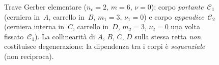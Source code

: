 \begin{figure}[!ht]
{
	}
	\caption{Trave Gerber elementare ($n_c=2$, $m=6$, $\nu=0$):
		corpo \emph{portante}~$\mathcal{C}_1$ (cerniera in~$A$, carrello
		in~$B$, $m_1=3$, $\nu_1=0$) e corpo \emph{appendice}~$\mathcal{C}_2$
		(cerniera interna in~$C$, carrello in~$D$, $m_2=3$, $\nu_2=0$
		una volta fissato~$\mathcal{C}_1$).
		La collinearità di $A$, $B$, $C$, $D$ sulla stessa retta
		\emph{non} costituisce degenerazione: la dipendenza tra i corpi
		è \emph{sequenziale} (non reciproca).}
	\label{fig:catalogo_gerber}
\end{figure}
